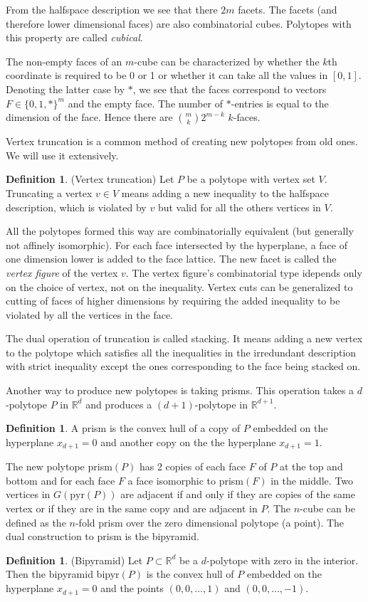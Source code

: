 \documentclass[a4paper,12pt]{book}
\theoremstyle{plain}
\theoremstyle{definition}
\newtheorem{definition}[theorem]{Definition}
\begin{document}
From the halfspace description we see that there $2m$ facets. The facets (and therefore lower dimensional faces)
are also combinatorial cubes. Polytopes with this property are called \textit{cubical}. 

The non-empty faces of an $m$-cube can be characterized by whether the $k$th coordinate 
is required to be 0 or 1 or whether it can take all the values in $[0,1]$. Denoting the latter case by $*$, we see
that the faces correspond to vectors $F \in \{0,1,*\}^m$ and the empty face. The number of $*$-entries 
is equal to the dimension of the face. Hence there are $\binom{m}{k} 2^{m-k}$ $k$-faces.


Vertex truncation is a common method of creating new polytopes from old ones.
We will use it extensively.
\begin{definition}
(Vertex truncation) Let $P$ be a polytope with vertex set $V$. Truncating a vertex $v \in V$ means adding
a new inequality to the halfspace description, which is violated by $v$ but valid for all the others vertices in $V$.
\end{definition}
All the polytopes formed this way are combinatorially equivalent (but generally not affinely isomorphic). 
For each face intersected by the hyperplane, 
a face of one dimension lower is added to the face lattice. The new facet is 
called the \textit{vertex figure} of the vertex $v$. The vertex figure's combinatorial type 
idepends only on the choice of vertex, not on the inequality. Vertex cuts can be generalized to cutting of 
faces of higher dimensions by requiring the added inequality to be violated by 
all the vertices in the face. 

The dual operation of truncation is called stacking. 
It means adding a new vertex to the polytope which satisfies all the 
inequalities in the irredundant description with strict inequality except the 
ones corresponding to the face being stacked on.

Another way to produce new polytopes is taking prisms. This operation takes a 
$d$-polytope $P$ in $\mathbb{R}^d$ and produces a $(d+1)$-polytope in 
$\mathbb{R}^{d+1}$. 
\begin{definition}
 A prism is the convex hull of a copy of $P$ embedded on the hyperplane 
$x_{d+1} = 0$ and another copy on the the hyperplane $x_{d+1} = 1$.
\end{definition}

 The new polytope prism$(P)$ has 2 copies of 
each face $F$ of $P$ at the top and bottom and for each face $F$ a face isomorphic to 
prism$(F)$ in the middle. Two vertices in $G(\text{pyr}(P))$ are adjacent if and only if
they are copies of the same vertex or if they are in the same copy and are 
adjacent in $P$. 
The $n$-cube can be defined as the $n$-fold 
prism over the zero dimensional polytope (a point). The dual construction to prism 
is the bipyramid. 
\begin{definition}
 (Bipyramid) Let $P\subset \mathbb{R}^d$ be a $d$-polytope with zero in the 
interior. Then the bipyramid bipyr$(P)$ is the convex hull of $P$ embedded on 
the hyperplane $x_{d+1} = 0$ and the points $(0,0,\dots, 1)$ and $(0,0,\dots, 
-1)$.
\end{definition}
\end{document}
